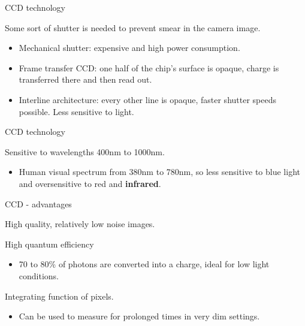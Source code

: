 \documentclass[compress]{beamer}
\providecommand{\tightlist}{%
  \setlength{\itemsep}{0pt}\setlength{\parskip}{0pt}}
\begin{document}
\begin{frame}{CCD technology}

Some sort of shutter is needed to prevent smear in the camera image.

\begin{itemize}
\tightlist
\item
  Mechanical shutter: expensive and high power consumption.
\item
  Frame transfer CCD: one half of the chip's surface is opaque, charge
  is transferred there and then read out.
\item
  Interline architecture: every other line is opaque, faster shutter
  speeds possible. Less sensitive to light.
\end{itemize}

\end{frame}

\begin{frame}{CCD technology}

Sensitive to wavelengths 400nm to 1000nm.

\begin{itemize}
\tightlist
\item
  Human visual spectrum from 380nm to 780nm, so less sensitive to blue
  light and oversensitive to red and \textbf{infrared}.
\end{itemize}

\end{frame}

\begin{frame}{CCD - advantages}

High quality, relatively low noise images.

High quantum efficiency

\begin{itemize}
\tightlist
\item
  70 to 80\% of photons are converted into a charge, ideal for low light
  conditions.
\end{itemize}

Integrating function of pixels.

\begin{itemize}
\tightlist
\item
  Can be used to measure for prolonged times in very dim settings.
\end{itemize}

\end{frame}
\end{document}
